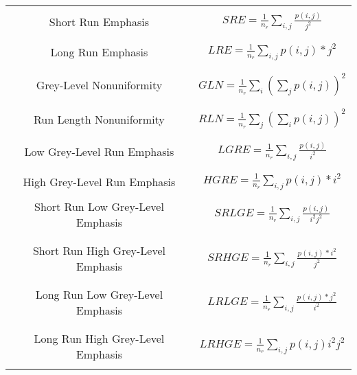 \begin{table}
\begin{center}
\begin{tabular}{|c|c|}
\hline
& \\
Short Run Emphasis & $ SRE = \frac{1}{n_r} \sum_{i, j}\frac{p(i, j)}{j^2} $ \\
& \\
\hline
& \\
Long Run Emphasis & $ LRE =  \frac{1}{n_r} \sum_{i, j}p(i, j) * j^2 $ \\
& \\
\hline
& \\
Grey-Level Nonuniformity & $ GLN = \frac{1}{n_r} \sum_{i} \left( \sum_{j}{p(i, j)} \right)^2 $ \\
& \\
\hline
& \\
Run Length Nonuniformity &  $ RLN = \frac{1}{n_r} \sum_{j} \left( \sum_{i}{p(i, j)} \right)^2 $ \\
& \\
\hline
& \\
Low Grey-Level Run Emphasis & $ LGRE = \frac{1}{n_r} \sum_{i, j}\frac{p(i, j)}{i^2} $ \\
& \\
\hline
& \\
High Grey-Level Run Emphasis & $ HGRE = \frac{1}{n_r} \sum_{i, j}p(i, j) * i^2 $ \\
& \\
\hline
Short Run Low Grey-Level Emphasis & $ SRLGE = \frac{1}{n_r} \sum_{i, j}\frac{p(i, j)}{i^2 j^2} $ \\
& \\
\hline
& \\
Short Run High Grey-Level Emphasis & $ SRHGE = \frac{1}{n_r} \sum_{i, j}\frac{p(i, j) * i^2}{j^2} $ \\
& \\
\hline
& \\
Long Run Low Grey-Level Emphasis & $ LRLGE = \frac{1}{n_r} \sum_{i, j}\frac{p(i, j) * j^2}{i^2} $ \\
& \\
\hline
& \\
Long Run High Grey-Level Emphasis & $ LRHGE = \frac{1}{n_r} \sum_{i, j} p(i, j) i^2 j^2 $ \\
& \\
\hline
\end{tabular}
\end{center}
\label{tab:haralickHigherOrderFeatures}
\end{table}

